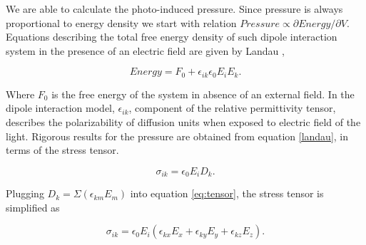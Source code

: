\documentclass[aps, prl, twocolumn, groupedaddress]{revtex4-1}
\begin{document}
We are able to calculate the photo-induced pressure. Since
pressure is always proportional to energy density we start with
relation $Pressure \propto \partial Energy / \partial V$. Equations
describing the total free energy density of such dipole interaction
system in the presence of an electric field are given by Landau
\cite{Landau},

\begin{equation}
  Energy = F_0 + \epsilon_{ik}\epsilon_0E_iE_k \mathrm{.}
  \label{landau}
\end{equation}

Where $F_0$ is the free energy of the system in absence of an external
field. In the dipole interaction model, $\epsilon_{ik}$, component of
the relative permittivity tensor, describes the polarizability of
diffusion units when exposed to electric field of the light. Rigorous
results for the pressure are obtained from equation \ref{landau}, in
terms of the stress tensor.

\begin{equation}
  \label{eq:tensor}
  \sigma_{ik} = \epsilon_0 E_i D_k \mathrm{.}
\end{equation}

Plugging $D_k = \Sigma (\epsilon_{km} E_m)$ into equation \ref{eq:tensor},
the stress tensor is simplified as

\begin{equation}
  \sigma_{ik} = \epsilon_0 E_i (\epsilon_{kx}E_x + \epsilon_{ky}E_y +
  \epsilon_{kz}E_z) \mathrm{.}
\end{equation}
\end{document}
